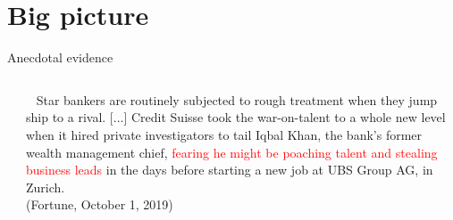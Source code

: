 \documentclass[notes,11pt, aspectratio=169]{beamer}
\begin{document}
\section{Big picture}
\begin{frame}{Anecdotal evidence}
\begin{columns}[c] %
  \begin{column}{.4\textwidth}
  \end{column}%
\hfill%
  \begin{column}{.5\textwidth}
    \faQuoteLeft~ Star bankers are routinely subjected to rough treatment when they jump ship to a rival. [...] Credit Suisse took the war-on-talent to a whole new level when it hired private investigators to tail Iqbal Khan, the bank’s former wealth management chief, \textcolor{red}{fearing he might be poaching talent and stealing business leads} in the days before starting a new job at UBS Group AG, in Zurich.~\faQuoteRight \\ \vspace{.2cm} \hfill  (Fortune, October 1, 2019)
  \end{column}%
\end{columns}
\end{frame}
\end{document}
